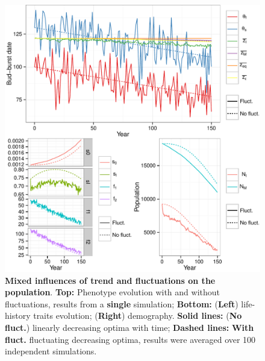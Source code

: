 \documentclass[a4paper, 12pt]{article}
\begin{document}
\begin{figure}[ht!]
	\centering
	\includegraphics[scale=1]{Figures/Trend.pdf}
	\caption{\textbf{Mixed influences of trend and fluctuations on the population}. \textbf{Top:} Phenotype evolution with and without fluctuations, results from a \textbf{single} simulation; \textbf{Bottom:} (\textbf{Left}) life-history traits evolution; (\textbf{Right}) demography. \textbf{Solid lines:} (\textbf{No fluct.}) linearly decreasing optima with time; \textbf{Dashed lines:} \textbf{With fluct.} fluctuating decreasing optima, results were averaged over 100 independent simulations.}
	\label{fig:trend}
\end{figure}
\end{document}
